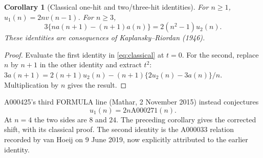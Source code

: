 \documentclass[11pt]{article}
\newtheorem{corollary}{Corollary}
\begin{document}
\begin{corollary}[Classical one-hit and two/three-hit identities]\label{cor:classical}
For $n\geq1$, $u_1(n)=2n v(n-1)$.
For $n\geq3$,
\[
 3\{n a(n+1)-(n+1)a(n)\}=2(n^2-1)u_2(n).
\]
These identities are consequences of Kaplansky--Riordan (1946).
\end{corollary}
\begin{proof}
Evaluate the first identity in \eqref{eq:classical} at $t=0$.
For the second, replace $n$ by $n+1$ in the other identity and extract $t^2$:
$3a(n+1)=2(n+1)u_2(n)-(n+1)\{2u_2(n)-3a(n)\}/n$.
Multiplication by $n$ gives the result.
\end{proof}

A000425's third FORMULA line (Mathar, 2 November 2015) instead conjectures
\[
u_1(n)=2n\mathrm{A000271}(n).
\]
At $n=4$ the two sides are $8$ and $24$.
The preceding corollary gives the corrected shift, with its classical proof.
The second identity is the A000033 relation recorded by van Hoeij on
9 June 2019, now explicitly attributed to the earlier identity.
\end{document}
